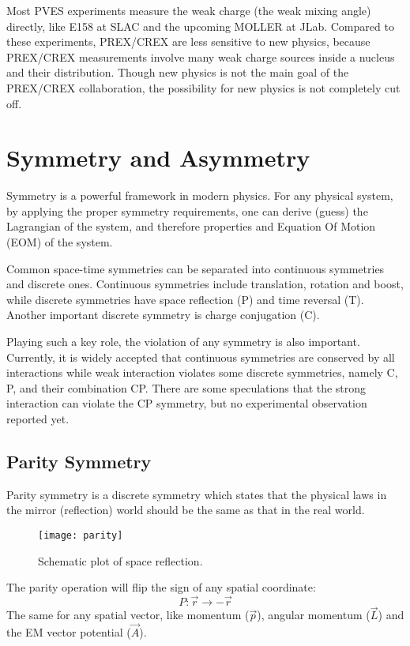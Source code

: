 Most PVES experiments measure the weak charge (the weak mixing angle) directly, like
E158 at SLAC and the upcoming MOLLER at JLab. Compared to these experiments, PREX/CREX
are less sensitive to new physics, because PREX/CREX measurements involve many 
weak charge sources inside a nucleus and their distribution. Though new physics
is not the main goal of the PREX/CREX collaboration, the possibility for new physics 
is not completely cut off.

\section{Symmetry and Asymmetry}
Symmetry is a powerful framework in modern physics. For any physical system, 
by applying the proper symmetry requirements, one can derive (guess) 
the Lagrangian of the system, and therefore properties and Equation Of Motion (EOM)
of the system.

Common space-time symmetries can be separated into continuous symmetries 
and discrete ones. Continuous symmetries include translation, rotation and
boost, while discrete symmetries have space reflection (P) and time reversal (T).
Another important discrete symmetry is charge conjugation (C).

Playing such a key role, the violation of any symmetry is also important.
Currently, it is widely accepted that continuous
symmetries are conserved by all interactions while weak interaction violates
some discrete symmetries, namely C, P, and their combination CP. There are some
speculations that the strong interaction can violate the CP symmetry, but no
experimental observation reported yet.

\subsection{Parity Symmetry}
Parity symmetry is a discrete symmetry which states that the physical laws in
the mirror (reflection) world should be the same as that in the real world. 
\begin{figure}[!h]
    \centering
    \texttt{[image: parity]}
    \caption{Schematic plot of space reflection.}
\end{figure}

The parity operation will flip the sign of any spatial coordinate:
\begin{equation}
    P: \vec{r} \rightarrow -\vec{r}
\end{equation}
The same for any spatial vector, like momentum ($\vec{p}$), angular momentum ($\vec{L}$)
and the EM vector potential ($\vec{A}$).


